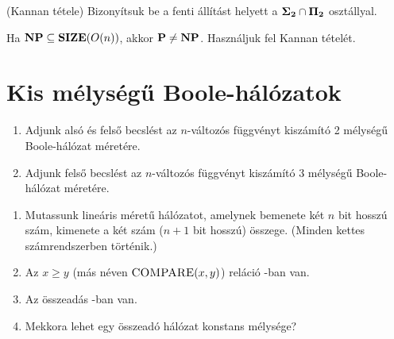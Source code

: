 \begin{Exercise}[counter={sorszam}, difficulty=2]
(Kannan tétele) Bizonyítsuk be a fenti állítást \PH helyett a $\mbox{\ensuremath{\mathbf{\Sigma_2}}} \cap \mbox{\ensuremath{\mathbf{\Pi_2}}}$ osztállyal.
\end{Exercise}


\begin{Exercise}[counter={sorszam}, difficulty=-1]
Ha $\mbox{\ensuremath{\mathbf{NP}}} \subseteq \mbox{\ensuremath{\mathbf{SIZE}}}(O(n))$, akkor $\mbox{\ensuremath{\mathbf{P}}} \neq \mbox{\ensuremath{\mathbf{NP}}}$. Használjuk fel Kannan tételét.
\end{Exercise}




\chapter{Kis mélységű Boole-hálózatok}

\begin{Exercise}[counter={sorszam}, difficulty=0]
\begin{enumerate}
 \item Adjunk alsó és felső becslést az $n$-változós  függvényt kiszámító 2 mélységű Boole-hálózat méretére.
 \item Adjunk felső becslést az $n$-változós  függvényt kiszámító 3 mélységű Boole-hálózat méretére.
\end{enumerate}
\end{Exercise}


\begin{Exercise}[counter={sorszam}, difficulty=0]
\begin{enumerate}
 \item Mutassunk lineáris méretű hálózatot, amelynek bemenete két
      $n$ bit hosszú szám, kimenete a két szám ($n+1$ bit hosszú) összege.
      (Minden kettes számrendszerben történik.)
 \item Az $x \geq y$ (más néven $\mbox{\sc{COMPARE}}(x,y)$) reláció \ACnull-ban van.
 \item Az összeadás \ACnull-ban van.
 \item \hard Mekkora lehet egy \ACnull összeadó hálózat konstans mélysége?
\end{enumerate}
\end{Exercise}


\begin{Exercise}[counter={sorszam}, difficulty=0]
\end{Exercise}


